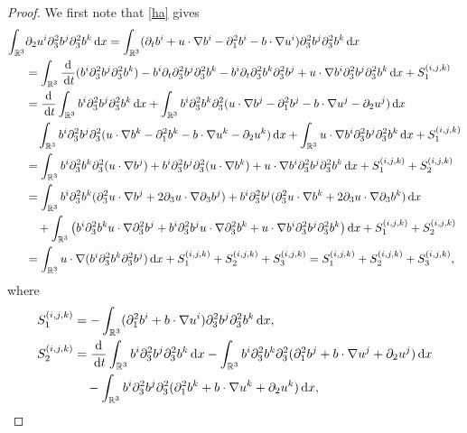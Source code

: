 \documentclass[11pt]{amsart}
\theoremstyle{definition}
\newcommand{\R}{\mathbb{R}}
\newcommand{\dx}{\,{\rm d}x}
\newcommand{\dt}{\,{\rm d}t}
\numberwithin{equation}{section}
\begin{document}
\begin{proof} We first note that \eqref{ha} gives
	\begin{align*}
		\int_{\R^3}&\partial_2u^i\partial_3^2b^j\partial_3^2b^k\dx=\int_{\R^3}({\partial_t}b^i+u\cdot\nabla{b}^i-\partial_1^2b^i -b\cdot\nabla{u}^i)\partial_3^2b^j\partial_3^2b^k\dx \\
		&=\int_{\R^3}\frac{\mathrm{d}}{\dt}(b^i\partial_3^2b^j\partial_3^2b^k)-b^i\partial_t\partial_3^2b^j\partial_3^2b^k-b^i\partial_t\partial_3^2b^k\partial_3^2b^j+u\cdot\nabla b^i\partial_3^2b^j\partial_3^2b^k\dx+S^{(i,j,k)}_1\\
		&=\frac{\mathrm{d}}{\dt}\int_{\R^3} b^i\partial_3^2b^j\partial_3^2b^k\dx+\int_{\R^3} b^i\partial_3^2b^k\partial_3^2(u\cdot\nabla{b}^j-\partial_1^2b^j -b\cdot\nabla{u}^j-\partial_2u^j)\dx\\
		&\quad\int_{\R^3} b^i\partial_3^2b^j\partial_3^2(u\cdot\nabla{b}^k-\partial_1^2b^k -b\cdot\nabla{u}^k-\partial_2u^k)\dx+\int_{\R^3} u\cdot\nabla b^i\partial_3^2b^j\partial_3^2b^k\dx+S^{(i,j,k)}_1\\
		&=\int_{\R^3} b^i\partial_3^2b^k\partial_3^2(u\cdot\nabla{b}^j)+b^i\partial_3^2b^j\partial_3^2(u\cdot\nabla{b}^k)+u\cdot\nabla b^i\partial_3^2b^j\partial_3^2b^k\dx+S^{(i,j,k)}_1+S^{(i,j,k)}_2\\
		&=\int_{\R^3} b^i\partial_3^2b^k(\partial_3^2u\cdot\nabla{b}^j+2\partial_3u\cdot\nabla\partial_3{b}^j)+b^i\partial_3^2b^j(\partial_3^2u\cdot\nabla{b}^k+2\partial_3u\cdot\nabla\partial_3{b}^k)\dx\\
		&\quad+\int_{\R^3} \big(b^i\partial_3^2b^ku\cdot\nabla\partial_3^2{b}^j+
		b^i\partial_3^2b^ju\cdot\nabla\partial_3^2{b}^k+u\cdot\nabla b^i\partial_3^2b^j\partial_3^2b^k\big)\dx+S^{(i,j,k)}_1+S^{(i,j,k)}_2\\
		&=\int_{\R^3} u\cdot \nabla(b^i\partial_3^2b^k\partial_3^2{b}^j)\dx+S^{(i,j,k)}_1+S^{(i,j,k)}_2+S^{(i,j,k)}_3=S^{(i,j,k)}_1+S^{(i,j,k)}_2+S^{(i,j,k)}_3,
	\end{align*}
	where
	\begin{align*}
		S^{(i,j,k)}_1&=-\int_{\R^3} (\partial_1^2b^i +b\cdot\nabla{u}^i)\partial_3^2b^j\partial_3^2b^k\dx,\\
		S^{(i,j,k)}_2&=\frac{\mathrm{d}}{\dt}\int_{\R^3} b^i\partial_3^2b^j\partial_3^2b^k\dx-\int_{\R^3} b^i\partial_3^2b^k\partial_3^2(\partial_1^2b^j +b\cdot\nabla{u}^j+\partial_2u^j)\dx\\
		&\quad-\int_{\R^3} b^i\partial_3^2b^j\partial_3^2(\partial_1^2b^k +b\cdot\nabla{u}^k+\partial_2u^k)\dx,\\

\end{align*}
\end{proof}
\end{document}
